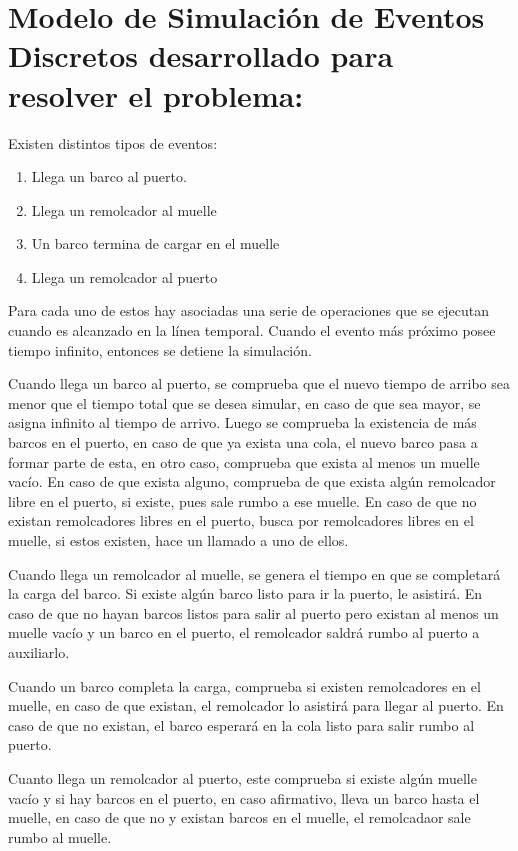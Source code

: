 \documentclass[titlepage,11pt]{scrartcl}
\begin{document}
\section{Modelo de Simulación de Eventos Discretos desarrollado para resolver el
problema:}

	Existen distintos tipos de eventos:
	
	\begin{enumerate}
		\item Llega un barco al puerto.
		\item Llega un remolcador al muelle
		\item Un barco termina de cargar en el muelle
		\item Llega un remolcador al puerto
	\end{enumerate}

	Para cada uno de estos hay asociadas una serie de operaciones que se ejecutan cuando es alcanzado en la línea temporal. Cuando el evento más próximo posee tiempo infinito, entonces se detiene la simulación.
	
	Cuando llega un barco al puerto, se comprueba que el nuevo tiempo de arribo sea menor que el tiempo total que se desea simular, en caso de que sea mayor, se asigna infinito al tiempo de arrivo. Luego se comprueba la existencia de más barcos en el puerto, en caso de que ya exista una cola, el nuevo barco pasa a formar parte de esta, en otro caso, comprueba que exista al menos un muelle vacío. En caso de que exista alguno, comprueba de que exista algún remolcador libre en el puerto, si existe, pues sale rumbo a ese muelle. En caso de que no existan remolcadores libres en el puerto, busca por remolcadores libres en el muelle, si estos existen, hace un llamado a uno de ellos.

	Cuando llega un remolcador al muelle, se genera el tiempo en que se completará la carga del barco. Si existe algún barco listo para ir la puerto, le asistirá. En caso de que no hayan barcos listos para salir al puerto pero existan al menos un muelle vacío y un barco en el puerto, el remolcador saldrá rumbo al puerto a auxiliarlo.

	Cuando un barco completa la carga, comprueba si existen remolcadores en el muelle, en caso de que existan, el remolcador lo asistirá para llegar al puerto. En caso de que no existan, el barco esperará en la cola listo para salir rumbo al puerto.

	Cuanto llega un remolcador al puerto, este comprueba si existe algún muelle vacío y si hay barcos en el puerto, en caso afirmativo, lleva un barco hasta el muelle, en caso de que no y existan barcos en el muelle, el remolcadaor sale rumbo al muelle.
\end{document}
